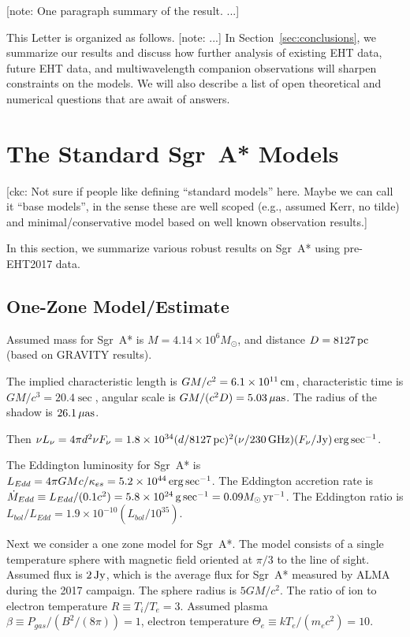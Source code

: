 \documentclass[twocolumn,tighten,dvipsnames]{aastex63}
\newcommand\sgra{Sgr~A*\xspace}
\newcommand\mbh{{M}} %
\newcommand\msun{{M_\odot}}
\newcommand\yr{{\rm \, yr}}
\newcommand\erg{{\rm \, erg}}
\newcommand\Jy{{\rm \, Jy}}
\newcommand\cm{{\rm \, cm}}
\newcommand\pc{{\rm \, pc}}
\newcommand\gm{{\rm \, g}}
\newcommand\uas{{\rm \, \mu as}}
\newcommand\GHz{{\rm \, GHz}}
\newcommand\<{{\langle}}
\renewcommand\>{{\rangle}} %
\newcommand\note[1]{{\color{OliveGreen}[note: #1]}}
\newcommand\ckc[1]{{\color{MidnightBlue}[ckc: #1]}}
\begin{document}
\note{One paragraph summary of the result.  ...}

This Letter is organized as follows.
\note{...}
In Section~\ref{sec:conclusions}, we summarize our results and discuss
how further analysis of existing EHT data, future EHT data, and
multiwavelength companion observations will sharpen constraints on the
models.
We will also describe a list of open theoretical and numerical
questions that are await of answers.

\section{The Standard \sgra Models}
\label{sec:basemodels}

\ckc{Not sure if people like defining ``standard models'' here.
  Maybe we can call it ``base models'', in the sense these are well
  scoped (e.g., assumed Kerr, no tilde) and minimal/conservative
  model based on well known observation results.}

In this section, we summarize various robust results on \sgra using
pre-EHT2017 data.

\subsection{One-Zone Model/Estimate}

Assumed mass for \sgra is $\mbh = 4.14 \times 10^6 \msun$, and
distance $D = 8127\pc$ (based on GRAVITY results).

The implied characteristic length is $G\mbh/c^2 = 6.1 \times 10^{11}
\cm$, characteristic time is $G\mbh/c^3 = 20.4 \sec$, angular scale is
$G\mbh/(c^2 D) = 5.03\uas$.
The radius of the shadow is $26.1\uas$.

Then $\nu L_\nu = 4 \pi d^2 \nu F_\nu = 1.8 \times 10^{34} (d/8127
\pc)^2 (\nu/230 \GHz)(F_\nu/{\rm Jy}) \erg \sec^{-1}$.

The Eddington luminosity for \sgra is $L_{Edd} = 4\pi G\mbh
c/\kappa_{es} = 5.2 \times 10^{44} \erg\sec^{-1}$. The Eddington
accretion rate is $\dot\mbh_{Edd} \equiv L_{Edd}/(0.1 c^2) = 5.8
\times 10^{24} \gm \sec^{-1} = 0.09 \msun \yr^{-1}$.
The Eddington ratio is $L_{bol}/L_{Edd} = 1.9 \times 10^{-10}
(L_{bol}/10^{35})$.

Next we consider a one zone model for \sgra.
The model consists of a single temperature sphere with magnetic field
oriented at $\pi/3$ to the line of sight.
Assumed flux is $2\Jy$, which is the average flux for \sgra measured
by ALMA during the 2017 campaign.
The sphere radius is $5 G\mbh/c^2$.
The ratio of ion to electron temperature $R \equiv T_i/T_e = 3$.
Assumed plasma $\beta \equiv P_{gas}/(B^2/(8\pi)) = 1$, electron
temperature $\Theta_e \equiv k T_e/(m_e c^2) = 10$.
\end{document}
